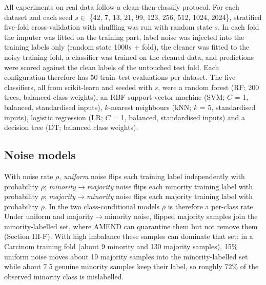 \documentclass[conference]{IEEEtran}
\begin{document}
All experiments on real data follow a clean-then-classify protocol. For each dataset and each seed $s \in $ \{42, 7, 13, 21, 99, 123, 256, 512, 1024, 2024\}, stratified five-fold cross-validation with shuffling was run with random state $s$. In each fold the imputer was fitted on the training part, label noise was injected into the training labels only (random state 1000$s$ + fold), the cleaner was fitted to the noisy training fold, a classifier was trained on the cleaned data, and predictions were scored against the clean labels of the untouched test fold. Each configuration therefore has 50 train--test evaluations per dataset. The five classifiers, all from scikit-learn \cite{pedregosa2011} and seeded with $s$, were a random forest (RF; 200 trees, balanced class weights), an RBF support vector machine (SVM; $C$ = 1, balanced, standardised inputs), $k$-nearest neighbours (kNN; $k$ = 5, standardised inputs), logistic regression (LR; $C$ = 1, balanced, standardised inputs) and a decision tree (DT; balanced class weights).

\subsection{Noise models}\label{sec:noise-models}

With noise rate $\rho $, \emph{uniform} noise flips each training label independently with probability $\rho $; \emph{minority$\rightarrow $majority} noise flips each minority training label with probability $\rho $; \emph{majority$\rightarrow $minority} noise flips each majority training label with probability $\rho $. In the two class-conditional models $\rho $ is therefore a per-class rate. Under uniform and majority$\rightarrow $minority noise, flipped majority samples join the minority-labelled set, where AMEND can quarantine them but not remove them (Section III-F). With high imbalance these samples can dominate that set: in a Carcinom training fold (about 9 minority and 130 majority samples), 15\% uniform noise moves about 19 majority samples into the minority-labelled set while about 7.5 genuine minority samples keep their label, so roughly 72\% of the observed minority class is mislabelled.
\end{document}

